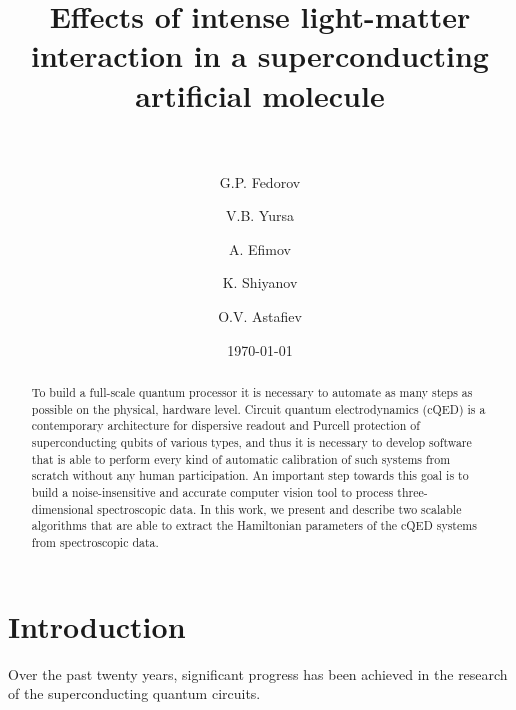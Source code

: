 \documentclass[%
 aip,
 amsmath,amssymb,
 reprint,%
]{revtex4-1}
\newcommand{\mytitile}{Effects of intense light-matter interaction in a superconducting artificial molecule}
\begin{document}
	
	\title[\mytitile]{\mytitile\\~}
	
	\author{G.P. Fedorov}
	
	
	\author{V.B. Yursa}
	
	\author{A. Efimov}
	

	\author{K. Shiyanov}


	\author{O.V. Astafiev}
	
	
	\date{\today}%
	
	
	\begin{abstract}
		To build a full-scale quantum processor it is necessary to automate as many steps as possible on the physical, hardware level. Circuit quantum electrodynamics (cQED) is a contemporary architecture for dispersive readout and Purcell protection of superconducting qubits of various types, and thus it is necessary to develop software that is able to perform every kind of automatic calibration of such systems from scratch without any human participation. An important step towards this goal is to build a noise-insensitive and accurate computer vision tool to process three-dimensional spectroscopic data. In this work, we present and describe two scalable algorithms that are able to extract the Hamiltonian parameters of the cQED systems from spectroscopic data. 
	\end{abstract}
	
	\maketitle
\section{Introduction}
Over the past twenty years, significant progress has been achieved in the research of the superconducting quantum circuits. 
\end{document}
